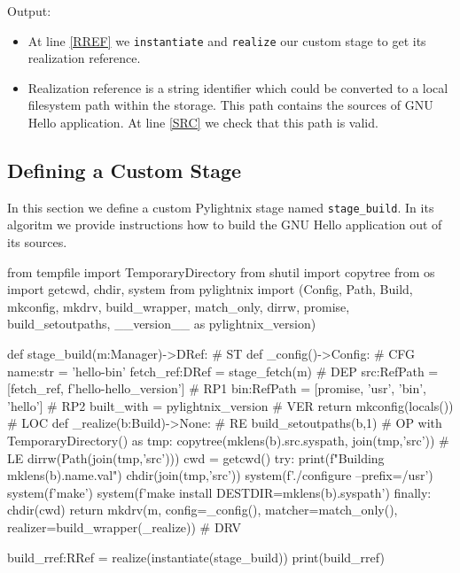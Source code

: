 Output:

\mysmallstdout

\begin{itemize}

  \item At line \ref{RREF} we \texttt{instantiate} and \texttt{realize} our
    custom stage to get its realization reference.

  \item Realization reference is a string identifier which could be converted to
    a local filesystem path within the storage. This path contains the sources
    of GNU Hello application. At line \ref{SRC} we check that this path is
    valid.

\end{itemize}

\pagebreak
\subsection{Defining a Custom Stage}

In this section we define a custom Pylightnix stage named \texttt{stage\_build}.
In its algoritm we provide instructions how to build the GNU Hello application
out of its sources.

\begin{pythontexcode}
from tempfile import TemporaryDirectory
from shutil import copytree
from os import getcwd, chdir, system
from pylightnix import (Config, Path, Build, mkconfig, mkdrv,
  build_wrapper, match_only, dirrw, promise, build_setoutpaths,
  __version__ as pylightnix_version)

def stage_build(m:Manager)->DRef:                            # ST \label{ST}
  def _config()->Config:                                     # CFG \label{CFG}
    name:str = 'hello-bin'
    fetch_ref:DRef = stage_fetch(m)                          # DEP \label{DEP}
    src:RefPath = [fetch_ref, f'hello-{hello_version}']      # RP1 \label{RP1}
    bin:RefPath = [promise, 'usr', 'bin', 'hello']           # RP2 \label{RP2}
    built_with = pylightnix_version                          # VER \label{VER}
    return mkconfig(locals())                                # LOC \label{LOC}
  def _realize(b:Build)->None:                               # RE \label{RE}
    build_setoutpaths(b,1)                                   # OP \label{OP}
    with TemporaryDirectory() as tmp:
      copytree(mklens(b).src.syspath, join(tmp,'src'))       # LE \label{LE}
      dirrw(Path(join(tmp,'src')))
      cwd = getcwd()
      try:
        print(f"Building {mklens(b).name.val}")
        chdir(join(tmp,'src'))
        system(f'./configure --prefix=/usr')
        system(f'make')
        system(f'make install DESTDIR={mklens(b).syspath}')
      finally:
        chdir(cwd)
  return mkdrv(m, config=_config(),
                  matcher=match_only(),
                  realizer=build_wrapper(_realize))          # DRV \label{DRV}

build_rref:RRef = realize(instantiate(stage_build))
print(build_rref)
\end{pythontexcode}


